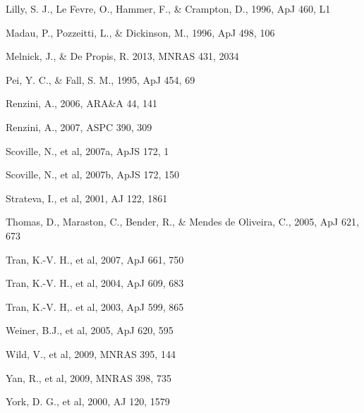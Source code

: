 \documentclass[referee]{aa}
\begin{document}
\begin{thebibliography}{}
 Lilly, S. J., Le Fevre, O., Hammer, F., \& Crampton, D., 1996, ApJ 460, L1




 Madau, P., Pozzeitti, L., \& Dickinson, M., 1996, ApJ 498, 106

 Melnick, J., \& De Propis,  R. 2013, MNRAS 431, 2034	

 Pei, Y. C., \& Fall, S. M., 1995, ApJ 454, 69

 Renzini, A., 2006, ARA\&A 44, 141

 Renzini, A., 2007, ASPC 390, 309





 Scoville, N., et al, 2007a, ApJS 172, 1

 Scoville, N., et al, 2007b, ApJS 172, 150




 Strateva, I., et al, 2001, AJ 122, 1861




 Thomas, D., Maraston, C., Bender, R., \& Mendes de Oliveira, C., 2005, ApJ 621, 673


 Tran, K.-V. H., et al, 2007, ApJ 661, 750

 Tran, K.-V. H., et al, 2004, ApJ 609, 683

 Tran, K.-V. H,. et al, 2003, ApJ 599, 865



 Weiner, B.J., et al, 2005, ApJ 620,  595

 Wild, V., et al, 2009, MNRAS 395, 144

 Yan, R., et al, 2009, MNRAS 398, 735

 York, D. G., et al, 2000, AJ 120, 1579


\end{thebibliography}

\end{document}

